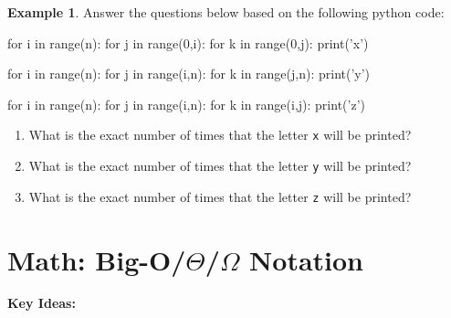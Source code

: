 \documentclass[10pt]{article}
\theoremstyle{definition}
\newtheorem{example}{Example}
\begin{document}
\newpage
\begin{example}
Answer the questions below based on the following python code:
\begin{python}
for i in range(n):
    for j in range(0,i):
        for k in range(0,j):
            print('x')

for i in range(n):
    for j in range(i,n):
        for k in range(j,n):
            print('y')

for i in range(n):
    for j in range(i,n):
        for k in range(i,j):
            print('z')

\end{python}
    \begin{enumerate}
        \item What is the exact number of times that the letter \texttt{x} will be printed?
            \vspace{1.5in}
        \item What is the exact number of times that the letter \texttt{y} will be printed?
            \vspace{1.5in}
        \item What is the exact number of times that the letter \texttt{z} will be printed?
    \end{enumerate}
\end{example}

\newpage
\section{Math: Big-O/$\Theta$/$\Omega$ Notation}

\textbf{Key Ideas:}
\vspace{4in}


\begin{center}
\end{center}
\end{document}
